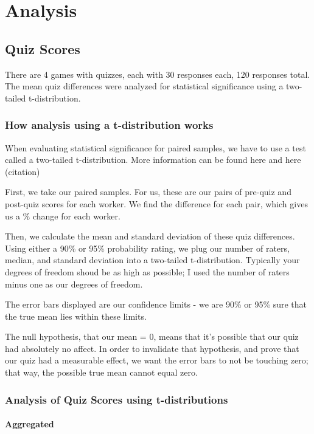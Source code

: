 \chapter{Analysis}

	\section{Quiz Scores}
		There are 4 games with quizzes, each with 30 responses each, 120 responses total. The mean quiz differences were analyzed for statistical significance using a two-tailed t-distribution.

		\subsection{How analysis using a t-distribution works}

			When evaluating statistical significance for paired samples, we have to use a test called a two-tailed t-distribution. More information can be found here and here (citation)

			First, we take our paired samples. For us, these are our pairs of pre-quiz and post-quiz scores for each worker. We find the difference for each pair, which gives us a \% change for each worker.

			Then, we calculate the mean and standard deviation of these quiz differences. Using either a 90\% or 95\% probability rating, we plug our number of raters, median, and standard deviation into a two-tailed t-distribution. Typically your degrees of freedom shoud be as high as possible; I used the number of raters minus one as our degrees of freedom.

			The error bars displayed are our confidence limits - we are 90\% or 95\% sure that the true mean lies within these limits. 

			The null hypothesis, that our mean = 0, means that it's possible that our quiz had absolutely no affect. In order to invalidate that hypothesis, and prove that our quiz had a measurable effect, we want the error bars to not be touching zero; that way, the possible true mean cannot equal zero.

		\subsection{Analysis of Quiz Scores using t-distributions}

			\subsubsection{Aggregated}

